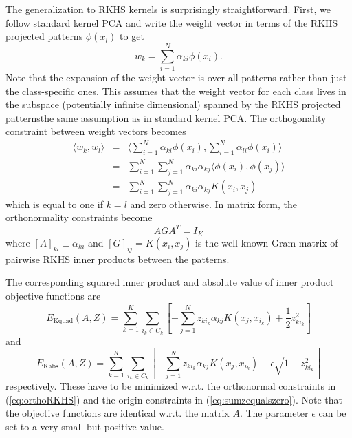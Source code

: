 The generalization to RKHS kernels is surprisingly straightforward.
First, we follow standard kernel PCA and write the weight vector in
terms of the RKHS projected patterns $\phi(x_{l})$ to get 
\begin{equation}
w_{k}=\sum_{i=1}^{N}\alpha_{ki}\phi(x_{i}).\label{eq:wkRKHS}
\end{equation}
Note that the expansion of the weight vector is over all patterns
rather than just the class-specific ones. This assumes that the weight
vector for each class lives in the subspace (potentially infinite
dimensional) spanned by the RKHS projected patterns\textemdash the
same assumption as in standard kernel PCA. The orthogonality constraint
between weight vectors becomes 
\begin{equation}
\begin{array}{ccc}
\langle w_{k},w_{l}\rangle & = & \langle\sum_{i=1}^{N}\alpha_{ki}\phi(x_{i}),\sum_{i=1}^{N}\alpha_{li}\phi(x_{i})\rangle\\
 & = & \sum_{i=1}^{N}\sum_{j=1}^{N}\alpha_{ki}\alpha_{kj}\langle\phi(x_{i}),\phi(x_{j})\rangle\\
 & = & \sum_{i=1}^{N}\sum_{j=1}^{N}\alpha_{ki}\alpha_{kj}K(x_{i},x_{j})
\end{array}\label{eq:wkwlRKHS}
\end{equation}
which is equal to one if $k=l$ and zero otherwise. In matrix form,
the orthonormality constraints become
\begin{equation}
AGA^{T}=I_{K}\label{eq:orthoRKHS}
\end{equation}
where $\left[A\right]_{kl}\equiv\alpha_{ki}$ and $\left[G\right]_{ij}=K(x_{i},x_{j})$
is the well-known Gram matrix of pairwise RKHS inner products between
the patterns. 

The corresponding squared inner product and absolute value of inner
product objective functions are {\small{}
\begin{equation}
E_{\mathrm{Kquad}}(A,Z)=\sum_{k=1}^{K}\sum_{i_{k}\in C_{k}}\left[-\sum_{j=1}^{N}z_{ki_{k}}\alpha_{kj}K(x_{j},x_{i_{k}})+\frac{1}{2}z_{ki_{k}}^{2}\right]\label{eq:Kquadobj}
\end{equation}
}and{\small{}
\begin{equation}
E_{\mathrm{Kabs}}(A,Z)=\sum_{k=1}^{K}\sum_{i_{k}\in C_{k}}\left[-\sum_{j=1}^{N}z_{ki_{k}}\alpha_{kj}K(x_{j},x_{i_{k}})-\epsilon\sqrt{1-z_{ki_{k}}^{2}}\right]\label{eq:Kabsobj}
\end{equation}
}respectively. These have to be minimized w.r.t. the orthonormal constraints
in (\ref{eq:orthoRKHS}) and the origin constraints in (\ref{eq:sumzequalszero}).
Note that the objective functions are identical w.r.t. the matrix
$A$. The parameter $\epsilon$ can be set to a very small but positive
value.
